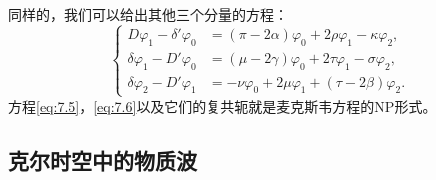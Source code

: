 同样的，我们可以给出其他三个分量的方程：
\begin{equation}
	\begin{cases}
		D\varphi _{1} -\delta '\varphi _{0} & =(\pi -2\alpha )\varphi _{0} +2\rho \varphi _{1} -\kappa \varphi _{2} ,\\
		\delta \varphi _{1} -D'\varphi _{0} & =(\mu -2\gamma )\varphi _{0} +2\tau \varphi _{1} -\sigma \varphi _{2} ,\\
		\delta \varphi _{2} -D'\varphi _{1} & =-\nu \varphi _{0} +2\mu \varphi _{1} +(\tau -2\beta )\varphi _{2} .
	\end{cases}
	\label{eq:7.6}
\end{equation}
方程\ref{eq:7.5}，\ref{eq:7.6}以及它们的复共轭就是麦克斯韦方程的NP形式。


\subsection{克尔时空中的物质波}

